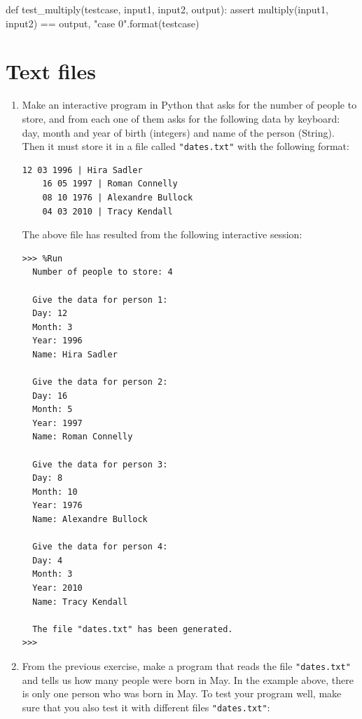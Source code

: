 \documentclass[
  fontsize=10pt,
  a4paper,
]{scrartcl}
\begin{document}
\begin{enumerate}
\begin{small}
\begin{python}
def test_multiply(testcase, input1, input2, output):
    assert multiply(input1, input2) == output, 
           "case {0}".format(testcase)
\end{python}
\end{small}

\end{enumerate}


\section{Text files}

\begin{enumerate}

\item Make an interactive program in Python that asks for the number of people to store, and from each one of them asks for the following data by keyboard: day, month and year of birth (integers) and name of the person (String). Then it must store it in a file called \verb|"dates.txt"| with the following format:


\begin{Verbatim}[frame=single, label={\em dates.txt}]
    12 03 1996 | Hira Sadler
    16 05 1997 | Roman Connelly
    08 10 1976 | Alexandre Bullock
    04 03 2010 | Tracy Kendall
\end{Verbatim}

The above file has resulted from the following interactive session:\\

\begin{Verbatim}[frame=single, label={\em example with 4 people}]
>>> %Run 
  Number of people to store: 4
  
  Give the data for person 1:
  Day: 12
  Month: 3
  Year: 1996
  Name: Hira Sadler
  
  Give the data for person 2:
  Day: 16
  Month: 5
  Year: 1997
  Name: Roman Connelly
  
  Give the data for person 3:
  Day: 8
  Month: 10
  Year: 1976
  Name: Alexandre Bullock
  
  Give the data for person 4:
  Day: 4
  Month: 3
  Year: 2010
  Name: Tracy Kendall
  
  The file "dates.txt" has been generated.
>>>
\end{Verbatim}



\item From the previous exercise, make a program that reads the file \verb|"dates.txt"| and tells us how many people were born in May. In the example above, there is only one person who was born in May. To test your program well, make sure that you also test it with different files \verb|"dates.txt"|:


\end{enumerate}
\end{document}
